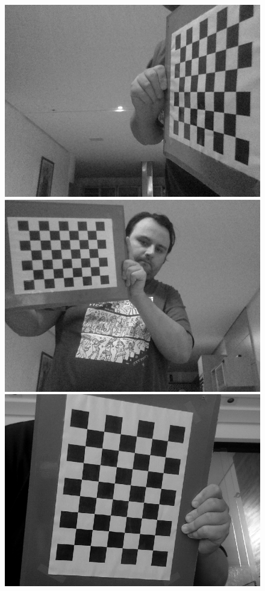 \documentclass[conference]{IEEEtran}
\begin{document}
\begin{figure}[!htb]
  \includegraphics[width=\linewidth]{snap-3.png}
\endminipage\hfill
{}
  \includegraphics[width=\linewidth]{snap-4.png}
\endminipage\hfill
{}
  \includegraphics[width=\linewidth]{snap-5.png}

\end{figure}
\end{document}
